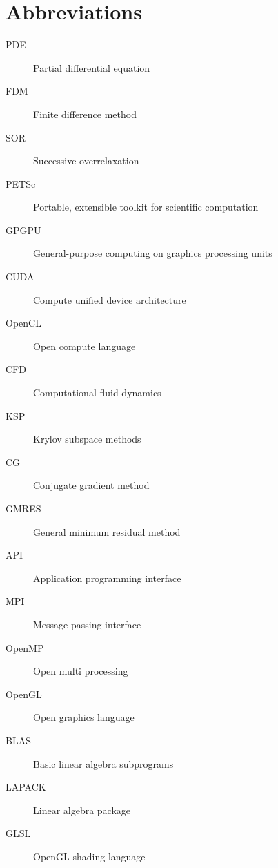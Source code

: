 \chapter{Abbreviations}

\begin{description}
	\item[PDE] Partial differential equation
	\item[FDM] Finite difference method
	\item[SOR] Successive overrelaxation
	\item[PETSc] Portable, extensible toolkit for scientific computation
	\item[GPGPU] General-purpose computing on graphics processing units
	\item[CUDA] Compute unified device architecture
	\item[OpenCL] Open compute language
	\item[CFD] Computational fluid dynamics
	\item[KSP] Krylov subspace methods
	\item[CG] Conjugate gradient method
	\item[GMRES] General minimum residual method
	\item[API] Application programming interface
	\item[MPI] Message passing interface
	\item[OpenMP] Open multi processing
	\item[OpenGL] Open graphics language
	\item[BLAS] Basic linear algebra subprograms
	\item[LAPACK] Linear algebra package
	\item[GLSL] OpenGL shading language
\end{description}
